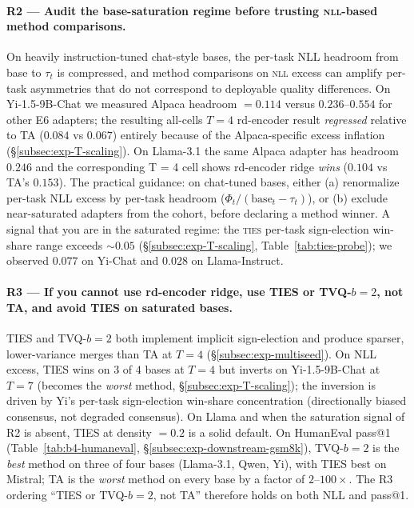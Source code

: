 \paragraph{R2 --- Audit the base-saturation regime before trusting
\textsc{nll}-based method comparisons.}
On heavily instruction-tuned chat-style bases, the per-task NLL
headroom from base to $\tau_t$ is compressed, and method comparisons
on \textsc{nll} excess can amplify per-task asymmetries that do not
correspond to deployable quality differences. On Yi-1.5-9B-Chat we
measured Alpaca headroom $= 0.114$ versus $0.236$--$0.554$ for other
E6 adapters; the resulting all-cells $T = 4$ rd-encoder result
\emph{regressed} relative to TA ($0.084$ vs $0.067$) entirely because
of the Alpaca-specific excess inflation
(\S\ref{subsec:exp-T-scaling}). On Llama-3.1 the same Alpaca adapter
has headroom $0.246$ and the corresponding T = 4 cell shows rd-encoder
ridge \emph{wins} ($0.104$ vs TA's $0.153$). The practical guidance:
on chat-tuned bases, either (a) renormalize per-task NLL excess by
per-task headroom ($\Phi_t / (\mathrm{base}_t - \tau_t)$), or (b)
exclude near-saturated adapters from the cohort, before declaring a
method winner. A signal that you are in the saturated regime: the
\textsc{ties} per-task sign-election win-share range exceeds $\sim 0.05$
(\S\ref{subsec:exp-T-scaling}, Table~\ref{tab:ties-probe}); we observed
$0.077$ on Yi-Chat and $0.028$ on Llama-Instruct.

\paragraph{R3 --- If you cannot use rd-encoder ridge, use TIES or
TVQ-$b{=}2$, not TA, and avoid TIES on saturated bases.}
TIES and TVQ-$b{=}2$ both implement implicit sign-election and produce
sparser, lower-variance merges than TA at $T = 4$
(\S\ref{subsec:exp-multiseed}). On NLL excess, TIES wins on $3$ of $4$
bases at $T = 4$ but inverts on Yi-1.5-9B-Chat at $T = 7$ (becomes the
\emph{worst} method, \S\ref{subsec:exp-T-scaling}); the inversion is
driven by Yi's per-task sign-election win-share concentration
(directionally biased consensus, not degraded consensus). On Llama and
when the saturation signal of R2 is absent, TIES at density $= 0.2$ is
a solid default. On HumanEval pass@1
(Table~\ref{tab:b4-humaneval}, \S\ref{subsec:exp-downstream-gsm8k}),
TVQ-$b{=}2$ is the \emph{best} method on three of four bases
(Llama-3.1, Qwen, Yi), with TIES best on Mistral; TA is the \emph{worst}
method on every base by a factor of $2$--$100\times$. The R3 ordering
``TIES or TVQ-$b{=}2$, not TA'' therefore holds on both NLL and
pass@1.

